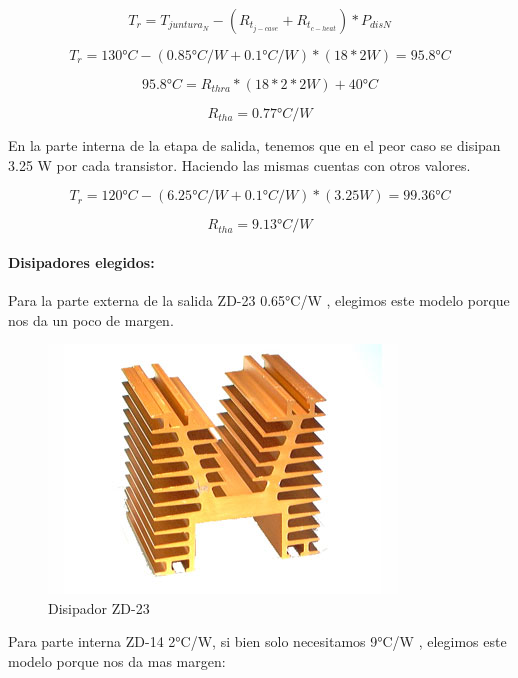 \documentclass[a4paper,12pt,twoside]{article}
\begin{document}
\begin{equation*}
T_r = T_{juntura_{N}} - (R_{t_{j-case}}+R_{t_{c-heat}})*P_{disN}
\end{equation*}

\begin{equation*}
T_r = 130°C - (0.85 °C/W + 0.1 °C/W)*(18*2 W) = 95.8 °C
\end{equation*}

\begin{equation*}
95.8°C = R_{thra}*(18*2*2 W) + 40°C
\end{equation*}

\begin{equation*}
R_{tha} = 0.77 °C/W
\end{equation*}

En la  parte interna de la etapa de salida, tenemos que en el peor caso se disipan 3.25  W por cada transistor.
Haciendo las mismas cuentas con otros valores.


\begin{equation*}
T_r = 120°C - (6.25°C/W + 0.1°C/W)*(3.25W) = 99.36 °C
\end{equation*}

\begin{equation*}
R_{tha} = 9.13 °C/W
\end{equation*}

\paragraph{Disipadores elegidos:}

Para la parte externa de la salida ZD-23 0.65°C/W , elegimos este modelo porque nos da un poco de margen.

\begin{figure}[H]
    \centering
    \includegraphics[height=0.4\textwidth]{img/zd23.jpg}
    \caption{Disipador ZD-23}
    \label{fig:diszd23}
\end{figure}


Para parte interna ZD-14 2°C/W, si bien solo necesitamos 9°C/W , elegimos este modelo porque nos da mas margen:
\end{document}
